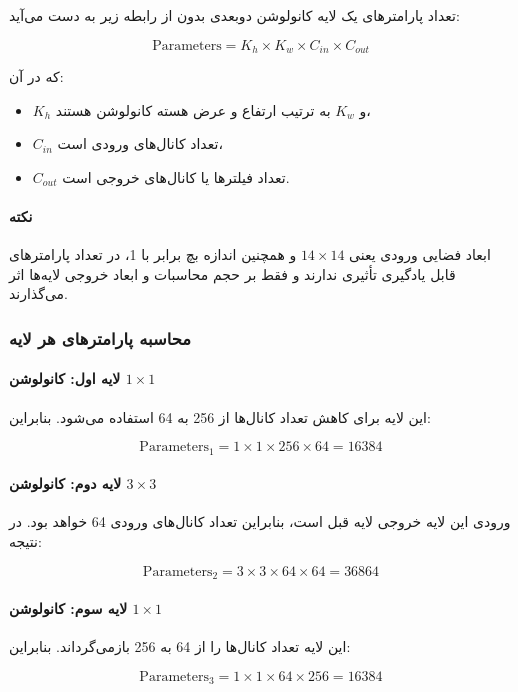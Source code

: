 \documentclass{article}
\begin{document}
تعداد پارامترهای یک لایه کانولوشن دوبعدی بدون  از رابطه زیر به دست می‌آید:

\[
\text{Parameters} = K_h \times K_w \times C_{in} \times C_{out}
\]

که در آن:
\begin{itemize}
	\item \(K_h\) و \(K_w\) به ترتیب ارتفاع و عرض هسته کانولوشن هستند،
	\item \(C_{in}\) تعداد کانال‌های ورودی است،
	\item \(C_{out}\) تعداد فیلترها یا کانال‌های خروجی است.
\end{itemize}

\paragraph{نکته}
ابعاد فضایی ورودی یعنی \(14\times14\) و همچنین اندازه بچ برابر با 1، در تعداد پارامترهای قابل یادگیری تأثیری ندارند و فقط بر حجم محاسبات و ابعاد خروجی لایه‌ها اثر می‌گذارند.

\subsubsection{محاسبه پارامترهای هر لایه}

\paragraph{لایه اول: کانولوشن \(1\times1\)}
این لایه برای کاهش تعداد کانال‌ها از 256 به 64 استفاده می‌شود. بنابراین:

\[
\text{Parameters}_1 = 1 \times 1 \times 256 \times 64 = 16384
\]

\paragraph{لایه دوم: کانولوشن \(3\times3\)}
ورودی این لایه خروجی لایه قبل است، بنابراین تعداد کانال‌های ورودی 64 خواهد بود. در نتیجه:

\[
\text{Parameters}_2 = 3 \times 3 \times 64 \times 64 = 36864
\]

\paragraph{لایه سوم: کانولوشن \(1\times1\)}
این لایه تعداد کانال‌ها را از 64 به 256 بازمی‌گرداند. بنابراین:

\[
\text{Parameters}_3 = 1 \times 1 \times 64 \times 256 = 16384
\]
\end{document}
